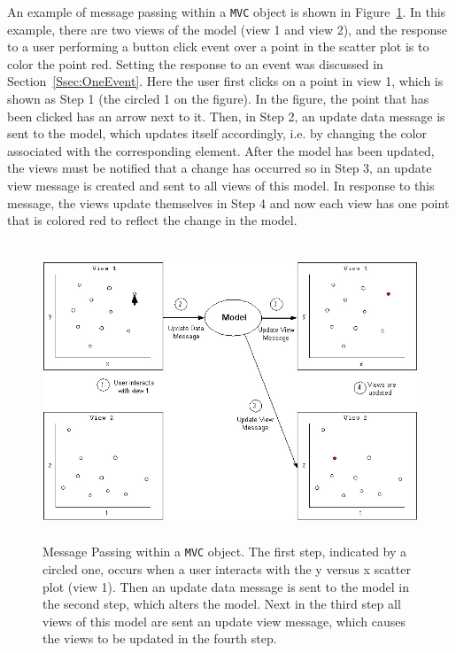 \documentclass{article}[11pt]
\newcommand{\Robject}[1]{{\texttt{#1}}}
\begin{document}
An example of message passing within a \Robject{MVC} object is shown
in Figure~\ref{Fig:MPwithin}.  In this example, there are two views of the
model (view 1 and view 2), and the response to a user
performing a button click event over a point in the scatter plot is to
color the point red.  Setting the response to an event was discussed
in Section~\ref{Ssec:OneEvent}.  Here the user first clicks on a point
in view 1, which is shown as Step 1 (the circled 1 on the
figure).  In the figure, the point that has been clicked has an arrow
next to it.  Then, in Step 2, an update data message is sent to the
model, which updates itself accordingly, i.e. by changing the color
associated with the corresponding element.  After the model has been
updated, the views must be notified that a change has occurred so in
Step 3, an update view message is created and sent to all views of
this model.  In response to this message, the views update themselves in
Step 4 and now each view has one point that is colored red to reflect the
change in the model.

\begin{figure}[ht]
  \begin{center}
    \includegraphics[height=3.5in, width=5in]{newMPwithin2.jpg}
    \caption{ Message Passing within a \Robject{MVC} object.  The first step,
      indicated by a circled one, occurs when a user interacts with the y
      versus x scatter plot (view 1).  Then an update data message is sent to
      the model in the second step, which alters the model.  Next in the third
      step all views of this model are sent an update view message, which
      causes the views to be updated in the fourth step. }
    \label{Fig:MPwithin}
  \end{center}
\end{figure}
\end{document}
